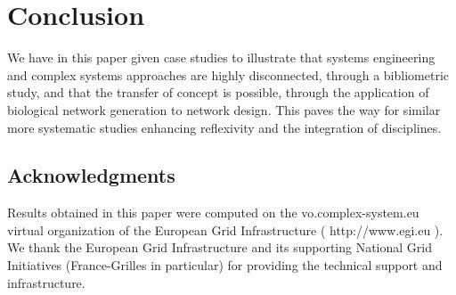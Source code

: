 \documentclass[runningheads,a4paper]{llncs}
\begin{document}
\section{Conclusion}

We have in this paper given case studies to illustrate that systems engineering and complex systems approaches are highly disconnected, through a bibliometric study, and that the transfer of concept is possible, through the application of biological network generation to network design. This paves the way for similar more systematic studies enhancing reflexivity and the integration of disciplines.



\subsection*{Acknowledgments}

\footnotesize
Results obtained in this paper were computed on the vo.complex-system.eu virtual organization of the European Grid Infrastructure ( http://www.egi.eu ). We thank the European Grid Infrastructure and its supporting National Grid Initiatives (France-Grilles in particular) for providing the technical support and infrastructure.



%
%
%
\end{document}
